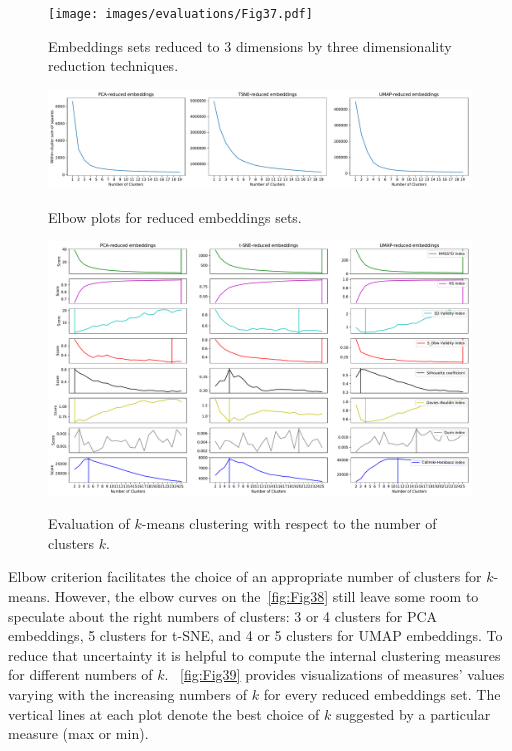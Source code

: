 \begin{figure}[!ht]
	\centering
	\texttt{[image: images/evaluations/Fig37.pdf]}\\
	\caption{Embeddings sets reduced to 3 dimensions by three dimensionality reduction techniques.}
	\label{fig:Fig37}
\end{figure}
\begin{figure}[!ht]
	\centering
	\includegraphics[width=1.0\textwidth]{images/evaluations/Fig38.pdf}\\
	\caption{Elbow plots for reduced embeddings sets.}
	\label{fig:Fig38}
\end{figure}
\begin{figure}[!ht]
	\centering
	\includegraphics[width=1.0\textwidth]{images/evaluations/Fig39.pdf}\\
	\caption{Evaluation of $k$-means clustering with respect to the number of clusters $k$.}
	\label{fig:Fig39}
\end{figure}

Elbow criterion facilitates the choice of an appropriate number of clusters for $k$-means. However, the elbow curves on the~\autoref{fig:Fig38} still leave some room to speculate about the right numbers of clusters: 3 or 4 clusters for PCA embeddings, 5 clusters for t-SNE, and 4 or 5 clusters for UMAP embeddings. To reduce that uncertainty it is helpful to compute the internal clustering measures for different numbers of $k$. ~\autoref{fig:Fig39} provides visualizations of measures' values varying with the increasing numbers of $k$ for every reduced embeddings set. The vertical lines at each plot denote the best choice of $k$ suggested by a particular measure (max or min).

